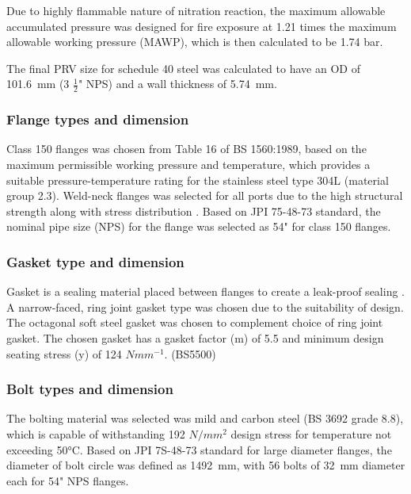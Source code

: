 Due to highly flammable nature of nitration reaction, the maximum allowable accumulated pressure was designed for fire exposure at 1.21 times the maximum allowable working pressure (MAWP), which is then calculated to be 1.74 bar. 

The final PRV size for schedule 40 steel was calculated to have an OD of \SI{101.6}{\milli \metre} (3 $\frac{1}{2}$" NPS) and a wall thickness of \SI{5.74}{\milli \metre}.



\subsubsection{Flange types and dimension}
Class 150 flanges was chosen from Table 16 of BS 1560:1989, based on the maximum permissible working pressure and temperature, which provides a suitable pressure-temperature rating for the stainless steel type 304L (material group 2.3). Weld-neck flanges was selected for all ports due to the high structural strength along with stress distribution \cite{ulma_forge_welding_2020}.
Based on JPI 75-48-73 standard, the nominal pipe size (NPS) for the flange was selected as 54" for class 150 flanges.
\subsubsection{Gasket type and dimension}
Gasket is a sealing material placed between flanges to create a leak-proof sealing \cite{varun_piping_nodate}. A narrow-faced, ring joint gasket type was chosen due to the suitability of design. The octagonal soft steel gasket was chosen to complement choice of ring joint gasket. The chosen gasket has a gasket factor (m) of 5.5 and minimum design seating stress (y) of 124 $Nmm^{-1}$. (BS5500)

\subsubsection{Bolt types and dimension}
The bolting material was selected was mild and carbon steel (BS 3692 grade 8.8), which is capable of withstanding 192 $N/mm^2$ design stress for temperature not exceeding 50°C. Based on JPI 7S-48-73 standard for large diameter flanges, the diameter of bolt circle was defined as \SI{1492}{\milli \metre}, with 56 bolts of \SI{32}{\milli \metre} diameter each for 54" NPS flanges. 

